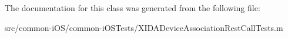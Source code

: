 The documentation for this class was generated from the following file\+:\begin{DoxyCompactItemize}
\item 
src/common-\/i\+O\+S/common-\/i\+O\+S\+Tests/X\+I\+D\+A\+Device\+Association\+Rest\+Call\+Tests.\+m\end{DoxyCompactItemize}
